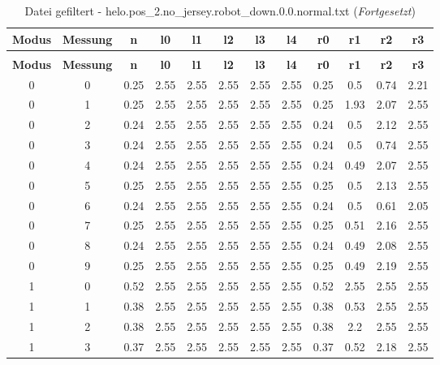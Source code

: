 \begin{longtable}{|c|c||c||c|c|c|c|c||c|c|c|c|}
	\caption{Datei gefiltert - helo.pos\_2.no\_jersey.robot\_down.0.0.normal.txt} \label{tab:helo.pos-2.no-jersey.robot-down.0.0.normal.txt} \\ \hline
	\textbf{Modus} & \textbf{Messung} & \textbf{n} & \textbf{l0} & \textbf{l1} & \textbf{l2} & \textbf{l3} & \textbf{l4} & \textbf{r0} & \textbf{r1} & \textbf{r2} & \textbf{r3}\\ \hline
	\endfirsthead
	\caption[]{Datei gefiltert - helo.pos\_2.no\_jersey.robot\_down.0.0.normal.txt (\emph{Fortgesetzt})} \\ \hline
	\textbf{Modus} & \textbf{Messung} & \textbf{n} & \textbf{l0} & \textbf{l1} & \textbf{l2} & \textbf{l3} & \textbf{l4} & \textbf{r0} & \textbf{r1} & \textbf{r2} & \textbf{r3}\\ \hline
	\endhead
	0 & 0 & 0.25 & 2.55 & 2.55 & 2.55 & 2.55 & 2.55 & 0.25 & 0.5 & 0.74 & 2.21 \\ \hline
	0 & 1 & 0.25 & 2.55 & 2.55 & 2.55 & 2.55 & 2.55 & 0.25 & 1.93 & 2.07 & 2.55 \\ \hline
	0 & 2 & 0.24 & 2.55 & 2.55 & 2.55 & 2.55 & 2.55 & 0.24 & 0.5 & 2.12 & 2.55 \\ \hline
	0 & 3 & 0.24 & 2.55 & 2.55 & 2.55 & 2.55 & 2.55 & 0.24 & 0.5 & 0.74 & 2.55 \\ \hline
	0 & 4 & 0.24 & 2.55 & 2.55 & 2.55 & 2.55 & 2.55 & 0.24 & 0.49 & 2.07 & 2.55 \\ \hline
	0 & 5 & 0.25 & 2.55 & 2.55 & 2.55 & 2.55 & 2.55 & 0.25 & 0.5 & 2.13 & 2.55 \\ \hline
	0 & 6 & 0.24 & 2.55 & 2.55 & 2.55 & 2.55 & 2.55 & 0.24 & 0.5 & 0.61 & 2.05 \\ \hline
	0 & 7 & 0.25 & 2.55 & 2.55 & 2.55 & 2.55 & 2.55 & 0.25 & 0.51 & 2.16 & 2.55 \\ \hline
	0 & 8 & 0.24 & 2.55 & 2.55 & 2.55 & 2.55 & 2.55 & 0.24 & 0.49 & 2.08 & 2.55 \\ \hline
	0 & 9 & 0.25 & 2.55 & 2.55 & 2.55 & 2.55 & 2.55 & 0.25 & 0.49 & 2.19 & 2.55 \\ \hline
	1 & 0 & 0.52 & 2.55 & 2.55 & 2.55 & 2.55 & 2.55 & 0.52 & 2.55 & 2.55 & 2.55 \\ \hline
	1 & 1 & 0.38 & 2.55 & 2.55 & 2.55 & 2.55 & 2.55 & 0.38 & 0.53 & 2.55 & 2.55 \\ \hline
	1 & 2 & 0.38 & 2.55 & 2.55 & 2.55 & 2.55 & 2.55 & 0.38 & 2.2 & 2.55 & 2.55 \\ \hline
	1 & 3 & 0.37 & 2.55 & 2.55 & 2.55 & 2.55 & 2.55 & 0.37 & 0.52 & 2.18 & 2.55 \\ \hline

\end{longtable}
